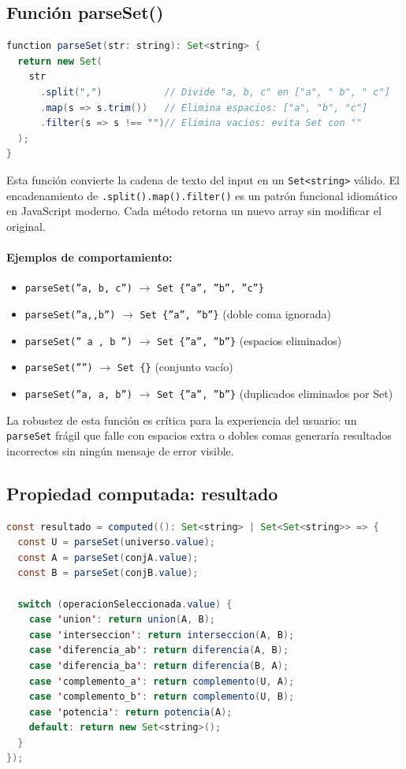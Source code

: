 \documentclass[11pt,a4paper]{article}
\begin{document}
\subsection{Función parseSet()}
\begin{lstlisting}[language=Java, caption={index.vue - función parseSet}]
function parseSet(str: string): Set<string> {
  return new Set(
    str
      .split(",")           // Divide "a, b, c" en ["a", " b", " c"]
      .map(s => s.trim())   // Elimina espacios: ["a", "b", "c"]
      .filter(s => s !== "")// Elimina vacios: evita Set con ""
  );
}
\end{lstlisting}

Esta función convierte la cadena de texto del input en un \texttt{Set<string>} válido. El encadenamiento de \texttt{.split().map().filter()} es un patrón funcional idiomático en JavaScript moderno. Cada método retorna un nuevo array sin modificar el original.

\paragraph{Ejemplos de comportamiento:}
\begin{itemize}[noitemsep]
    \item \texttt{parseSet(''a, b, c'')} $\rightarrow$ \texttt{Set \{''a'', ''b'', ''c''\}}
    \item \texttt{parseSet(''a,,b'')} $\rightarrow$ \texttt{Set \{''a'', ''b''\}} (doble coma ignorada)
    \item \texttt{parseSet('' a , b '')} $\rightarrow$ \texttt{Set \{''a'', ''b''\}} (espacios eliminados)
    \item \texttt{parseSet('''')} $\rightarrow$ \texttt{Set \{\}} (conjunto vacío)
    \item \texttt{parseSet(''a, a, b'')} $\rightarrow$ \texttt{Set \{''a'', ''b''\}} (duplicados eliminados por Set)
\end{itemize}
La robustez de esta función es crítica para la experiencia del usuario: un \texttt{parseSet} frágil que falle con espacios extra o dobles comas generaría resultados incorrectos sin ningún mensaje de error visible.

\subsection{Propiedad computada: resultado}
\begin{lstlisting}[language=Java, caption={index.vue - computed resultado}]
const resultado = computed((): Set<string> | Set<Set<string>> => {
  const U = parseSet(universo.value);
  const A = parseSet(conjA.value);
  const B = parseSet(conjB.value);

  switch (operacionSeleccionada.value) {
    case 'union': return union(A, B);
    case 'interseccion': return interseccion(A, B);
    case 'diferencia_ab': return diferencia(A, B);
    case 'diferencia_ba': return diferencia(B, A);
    case 'complemento_a': return complemento(U, A);
    case 'complemento_b': return complemento(U, B);
    case 'potencia': return potencia(A);
    default: return new Set<string>();
  }
});
\end{lstlisting}
\end{document}
